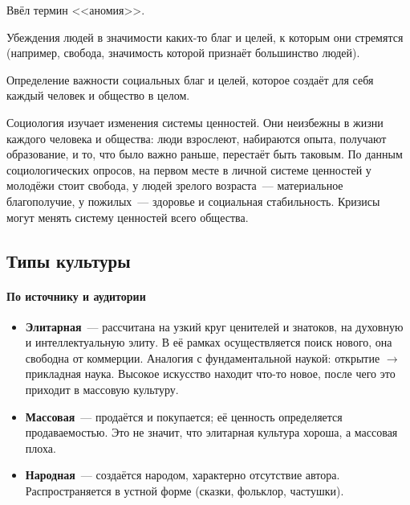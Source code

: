 \documentclass[12pt]{article}
\begin{document}
	\begin{person}
		Ввёл термин <<аномия>>.
	\end{person}

	\begin{definition}
		Убеждения людей в значимости каких-то благ и целей, к которым они стремятся (например, свобода, значимость которой признаёт большинство людей).
	\end{definition}

	\begin{definition}
		Определение важности социальных благ и целей, которое создаёт для себя каждый человек и общество в целом.
	\end{definition}

	\begin{note}
		Социология изучает изменения системы ценностей. Они неизбежны в жизни каждого человека и общества: люди взрослеют, набираются опыта, получают образование, и то, что было важно раньше, перестаёт быть таковым. По данным социологических опросов, на первом месте в личной системе ценностей у молодёжи стоит свобода, у людей зрелого возраста~--- материальное благополучие, у пожилых~--- здоровье и социальная стабильность. Кризисы могут менять систему ценностей всего общества.
	\end{note}

	\subsection{Типы культуры}

	\paragraph{По источнику и аудитории}
	\begin{itemize}
		\item \textbf{Элитарная}~--- рассчитана на узкий круг ценителей и знатоков, на духовную и интеллектуальную элиту. В её рамках осуществляется поиск нового, она свободна от коммерции. Аналогия с фундаментальной наукой: открытие $\to$ прикладная наука. Высокое искусство находит что-то новое, после чего это приходит в массовую культуру.
		\item \textbf{Массовая}~--- продаётся и покупается; её ценность определяется продаваемостью. Это не значит, что элитарная культура хороша, а массовая плоха.
		\item \textbf{Народная}~--- создаётся народом, характерно отсутствие автора. Распространяется в устной форме (сказки, фольклор, частушки).
	\end{itemize}
\end{document}
